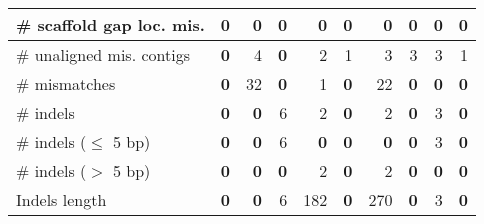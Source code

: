 \documentclass[12pt,a4paper]{article}
\begin{document}
\begin{table}[ht]
\begin{center}
\begin{tabular}{|l*{9}{|r}|}
\# scaffold gap loc. mis. & 0 & 0 & 0 & 0 & 0 & 0 & 0 & 0 & 0 \\ \hline
\# unaligned mis. contigs & {\bf 0} & 4 & {\bf 0} & 2 & 1 & 3 & 3 & 3 & 1 \\ \hline
\# mismatches & {\bf 0} & 32 & {\bf 0} & 1 & {\bf 0} & 22 & {\bf 0} & {\bf 0} & {\bf 0} \\ \hline
\# indels & {\bf 0} & {\bf 0} & 6 & 2 & {\bf 0} & 2 & {\bf 0} & 3 & {\bf 0} \\ \hline
\hspace{5mm}\# indels ($\leq$ 5 bp) & {\bf 0} & {\bf 0} & 6 & {\bf 0} & {\bf 0} & {\bf 0} & {\bf 0} & 3 & {\bf 0} \\ \hline
\hspace{5mm}\# indels ($>$ 5 bp) & {\bf 0} & {\bf 0} & {\bf 0} & 2 & {\bf 0} & 2 & {\bf 0} & {\bf 0} & {\bf 0} \\ \hline
Indels length & {\bf 0} & {\bf 0} & 6 & 182 & {\bf 0} & 270 & {\bf 0} & 3 & {\bf 0} \\ \hline
\end{tabular}
\end{center}
\end{table}
\end{document}
